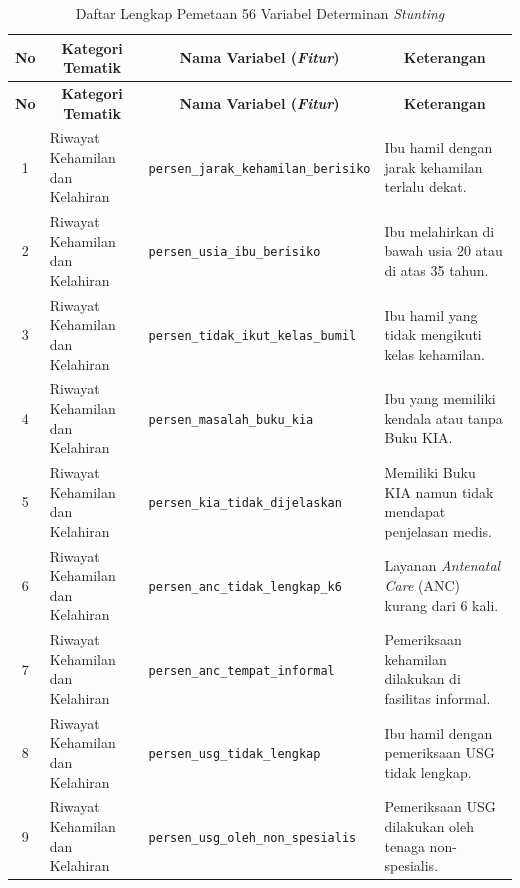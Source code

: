 \begin{longtable}{|c|p{}|p{}|p{}|}
    \caption{Daftar Lengkap Pemetaan 56 Variabel Determinan \textit{Stunting}}
    \label{table:lampiran_variabel}\\
    \hline
    \textbf{No} & \multicolumn{1}{c|}{\textbf{Kategori Tematik}} & \multicolumn{1}{c|}{\textbf{Nama Variabel (\textit{Fitur})}} & \multicolumn{1}{c|}{\textbf{Keterangan}} \tabularnewline 
    \hline
    \endfirsthead
    \hline
    \textbf{No} & \multicolumn{1}{c|}{\textbf{Kategori Tematik}} & \multicolumn{1}{c|}{\textbf{Nama Variabel (\textit{Fitur})}} & \multicolumn{1}{c|}{\textbf{Keterangan}} \tabularnewline 
    \hline
    \endhead
    \hline
    \endfoot
    \hline
    \endlastfoot
    
    1 & Riwayat Kehamilan dan Kelahiran & \texttt{persen\_\allowbreak jarak\_\allowbreak kehamilan\_\allowbreak berisiko} & Ibu hamil dengan jarak kehamilan terlalu dekat. \tabularnewline \hline
    2 & Riwayat Kehamilan dan Kelahiran & \texttt{persen\_\allowbreak usia\_\allowbreak ibu\_\allowbreak berisiko} & Ibu melahirkan di bawah usia 20 atau di atas 35 tahun. \tabularnewline \hline
    3 & Riwayat Kehamilan dan Kelahiran & \texttt{persen\_\allowbreak tidak\_\allowbreak ikut\_\allowbreak kelas\_\allowbreak bumil} & Ibu hamil yang tidak mengikuti kelas kehamilan. \tabularnewline \hline
    4 & Riwayat Kehamilan dan Kelahiran & \texttt{persen\_\allowbreak masalah\_\allowbreak buku\_\allowbreak kia} & Ibu yang memiliki kendala atau tanpa Buku KIA. \tabularnewline \hline
    5 & Riwayat Kehamilan dan Kelahiran & \texttt{persen\_\allowbreak kia\_\allowbreak tidak\_\allowbreak dijelaskan} & Memiliki Buku KIA namun tidak mendapat penjelasan medis. \tabularnewline \hline
    6 & Riwayat Kehamilan dan Kelahiran & \texttt{persen\_\allowbreak anc\_\allowbreak tidak\_\allowbreak lengkap\_\allowbreak k6} & Layanan \textit{Antenatal Care} (ANC) kurang dari 6 kali. \tabularnewline \hline
    7 & Riwayat Kehamilan dan Kelahiran & \texttt{persen\_\allowbreak anc\_\allowbreak tempat\_\allowbreak informal} & Pemeriksaan kehamilan dilakukan di fasilitas informal. \tabularnewline \hline
    8 & Riwayat Kehamilan dan Kelahiran & \texttt{persen\_\allowbreak usg\_\allowbreak tidak\_\allowbreak lengkap} & Ibu hamil dengan pemeriksaan USG tidak lengkap. \tabularnewline \hline
    9 & Riwayat Kehamilan dan Kelahiran & \texttt{persen\_\allowbreak usg\_\allowbreak oleh\_\allowbreak non\_\allowbreak spesialis} & Pemeriksaan USG dilakukan oleh tenaga non-spesialis. \tabularnewline \hline

\end{longtable}
